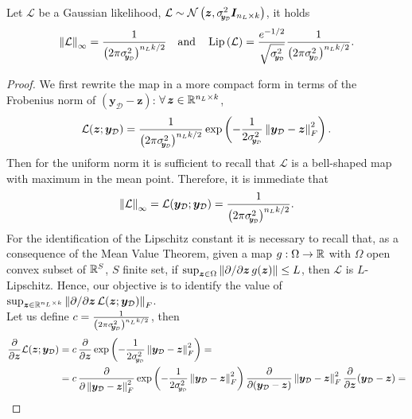 \begin{proposition} \label{prop:likelihood}
	Let $\mathcal{L}$ be a Gaussian likelihood, $\mathcal{L} \sim \normal{\bm{z}}{\sigmay^2 \bm{I}_{n_L \times k}}$, it holds
	\begin{equation*}
		\norm{\mathcal{L}}_{\infty} = \frac{1}{\left(2 \pi \sigmay^2\right)^{n_L k / 2}} \quad \text{and} \quad \lipschitz{\mathcal{L}} = \frac{e^{-1/2}}{\sqrt{\sigmay^2}} \frac{1}{\left(2 \pi \sigmay^2\right)^{n_L k / 2}}.
	\end{equation*}
\end{proposition}
\begin{proof}
	We first rewrite the map in a more compact form in terms of the Frobenius norm of $(\bm{y}_{\mathcal{D}} - \bm{z})$: $\forall \bm{z} \in \real^{n_L \times k}$,
	\begin{equation*}
		\mathcal{L}(\bm{z}; \bm{y}_{\mathcal{D}}) = \frac{1}{\left(2 \pi \sigmay^2\right)^{n_L k / 2}} \exp{-\frac{1}{2\sigmay^2} \norm{\bm{y}_{\mathcal{D}} - \bm{z}}_F^2}.
	\end{equation*}
	Then for the uniform norm it is sufficient to recall that $\mathcal{L}$ is a bell-shaped map with maximum in the mean point. 
	Therefore, it is immediate that
	\begin{equation*}
		\norm{\mathcal{L}}_{\infty} = \mathcal{L}(\bm{y}_{\mathcal{D}}; \bm{y}_{\mathcal{D}}) = \frac{1}{\left(2 \pi \sigmay^2\right)^{n_L k / 2}}.
	\end{equation*}
	For the identification of the Lipschitz constant it is necessary to recall that, as a consequence of the Mean Value Theorem, given a map $g: \Omega \to \mathbb{R}$ with $\Omega$ open convex subset of $\mathbb{R}^S$, $S$ finite set, if $\sup_{\bm{z} \in \Omega} \left\lVert\partial / \partial \bm{z} \, g(\bm{z})\right\rVert \leq L$, then $\mathcal{L}$ is $L$-Lipschitz.
	Hence, our objective is to identify the value of $\sup_{\bm{z} \in \mathbb{R}^{n_L \times k}} \left\lVert\partial / \partial \bm{z} \, \mathcal{L}(\bm{z}; \bm{y}_{\mathcal{D}})\right\rVert_F$. \\
	Let us define $c = \frac{1}{\left(2 \pi \sigmay^2\right)^{n_L k / 2}}$, then
	\begin{equation*}
		\begin{aligned}
			\frac{\partial}{\partial \bm{z}} \mathcal{L}(\bm{z}; \bm{y}_{\mathcal{D}}) & = c \, \frac{\partial}{\partial \bm{z}} \exp{-\frac{1}{2\sigmay^2} \norm{\bm{y}_{\mathcal{D}} - \bm{z}}_F^2} = \\
			& = c \, \frac{\partial}{\partial \norm{\bm{y}_{\mathcal{D}} - \bm{z}}_F^2} \exp{-\frac{1}{2\sigmay^2} \norm{\bm{y}_{\mathcal{D}} - \bm{z}}_F^2} \frac{\partial}{\partial (\bm{y}_{\mathcal{D}} - \bm{z})} \norm{\bm{y}_{\mathcal{D}} - \bm{z}}_F^2 \frac{\partial}{\partial \bm{z}} (\bm{y}_{\mathcal{D}} - \bm{z}) = \\

\end{aligned}
\end{equation*}
\end{proof}
